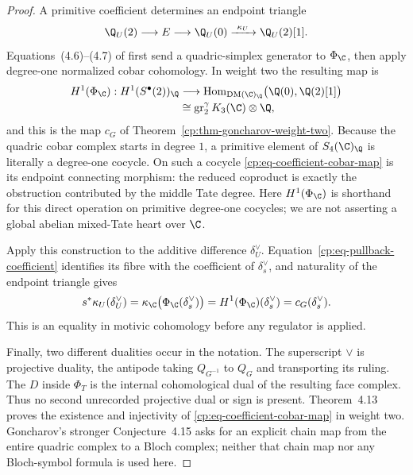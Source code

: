 \begin{proof}
A primitive coefficient determines an endpoint triangle
\begin{equation}
 \Q_U(2)\longrightarrow E\longrightarrow\Q_U(0)
 \xrightarrow{\ \kappa_U\ }\Q_U(2)[1].
 \label{cp:eq-endpoint-triangle}
\end{equation}
Equations~(4.6)--(4.7) of \cite{Goncharov1999} first send a
quadric-simplex generator to \(\Phi_\C\), then apply degree-one normalized
cobar cohomology.  In weight two the resulting map is
\begin{equation}
\begin{split}
 H^1(\Phi_\C):H^1(S^\bullet(2))_\Q
 &\longrightarrow
 \operatorname{Hom}_{\DM(\C)_\Q}
       \bigl(\Q(0),\Q(2)[1]\bigr)\\
 &\cong\gr_2^\gamma K_3(\C)\otimes\Q,
\end{split}
\label{cp:eq-coefficient-cobar-map}
\end{equation}
and this is the map \(c_G\) of
Theorem~\ref{cp:thm-goncharov-weight-two}.  Because the quadric cobar
complex starts in degree \(1\), a primitive element of \(S_4(\C)_\Q\) is
literally a degree-one cocycle.  On such a cocycle
\eqref{cp:eq-coefficient-cobar-map} is its endpoint connecting morphism:
the reduced coproduct is exactly the obstruction contributed by the middle
Tate degree.
Here \(H^1(\Phi_\C)\) is shorthand for this direct operation on primitive
degree-one cocycles; we are not asserting a global abelian mixed-Tate heart
over \(\C\).

Apply this construction to the additive difference
\(\delta_U^\vee\).  Equation~\eqref{cp:eq-pullback-coefficient} identifies
its fibre with the coefficient of \(\delta_s^\vee\), and naturality of the
endpoint triangle gives
\[
 s^*\kappa_U(\delta_U^\vee)
 =\kappa_\C\bigl(\Phi_\C(\delta_s^\vee)\bigr)
 =H^1(\Phi_\C)(\delta_s^\vee)
 =c_G(\delta_s^\vee).
\]
This is an equality in motivic cohomology before any regulator is applied.

Finally, two different dualities occur in the notation.  The superscript
\(\vee\) is projective duality, the antipode taking
\(Q_{G^{-1}}\) to \(Q_G\) and transporting its ruling.  The \(D\) inside
\(\Phi_T\) is the internal cohomological dual of the resulting face
complex.  Thus no second unrecorded projective dual or sign is present.
Theorem~4.13 proves the existence and injectivity of
\eqref{cp:eq-coefficient-cobar-map} in weight two.  Goncharov's stronger
Conjecture~4.15 asks for an explicit chain map from the entire quadric
complex to a Bloch complex; neither that chain map nor any Bloch-symbol
formula is used here.
\end{proof}

